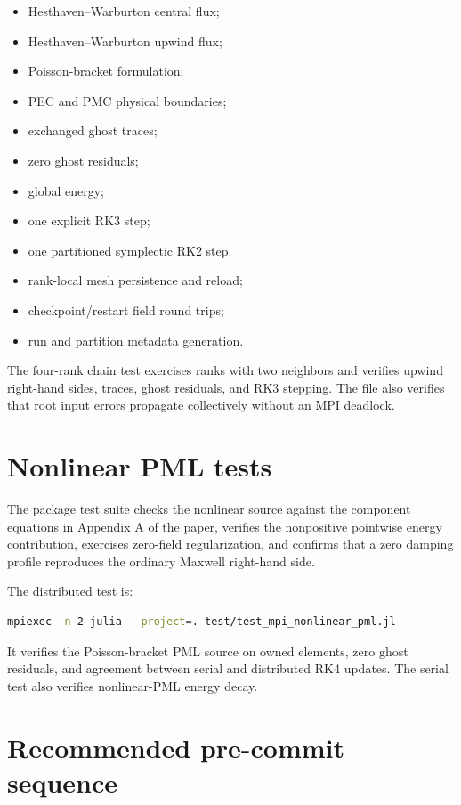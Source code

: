 \documentclass[11pt,oneside]{book}
\begin{document}
\begin{itemize}[leftmargin=*]
  \item Hesthaven--Warburton central flux;
  \item Hesthaven--Warburton upwind flux;
  \item Poisson-bracket formulation;
  \item PEC and PMC physical boundaries;
  \item exchanged ghost traces;
  \item zero ghost residuals;
  \item global energy;
  \item one explicit RK3 step;
  \item one partitioned symplectic RK2 step.
  \item rank-local mesh persistence and reload;
  \item checkpoint/restart field round trips;
  \item run and partition metadata generation.
\end{itemize}

The four-rank chain test exercises ranks with two neighbors and verifies
upwind right-hand sides, traces, ghost residuals, and RK3 stepping. The file
also verifies that root input errors propagate collectively without an MPI
deadlock.

\section{Nonlinear PML tests}

The package test suite checks the nonlinear source against the component
equations in Appendix A of the paper, verifies the nonpositive pointwise
energy contribution, exercises zero-field regularization, and confirms that a
zero damping profile reproduces the ordinary Maxwell right-hand side.

The distributed test is:
\begin{lstlisting}[language=bash]
mpiexec -n 2 julia --project=. test/test_mpi_nonlinear_pml.jl
\end{lstlisting}
It verifies the Poisson-bracket PML source on owned elements, zero ghost
residuals, and agreement between serial and distributed RK4 updates. The
serial test also verifies nonlinear-PML energy decay.

\section{Recommended pre-commit sequence}
\end{document}
